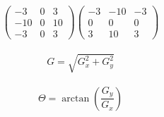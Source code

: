 \documentclass{article}
\begin{document}
\begin{equation}
\begin{pmatrix}
-3 & 0 & 3 \\
-10 & 0 & 10 \\
-3 & 0 & 3
\end{pmatrix}
\begin{pmatrix}
-3 & -10 & -3 \\
0 & 0 & 0 \\
3 & 10 & 3
\end{pmatrix}
\end{equation}
\\

\begin{equation}
G = \sqrt{G_x^2 + G_y^2}
\end{equation}
\\

\begin{equation}
\Theta = \arctan\left(\frac{G_y}{G_x}\right)
\end{equation}
\\
\end{document}
